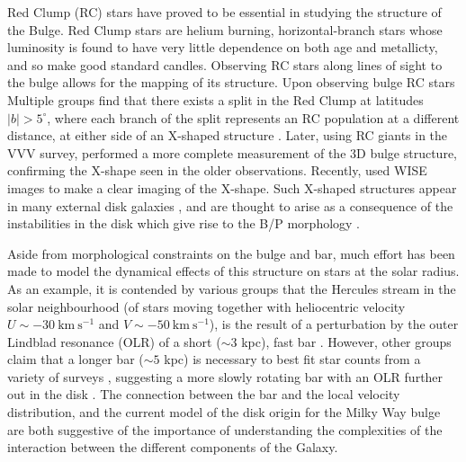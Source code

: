 Red Clump (RC) stars have proved to be essential in studying the structure of the Bulge. Red Clump stars are helium burning, horizontal-branch stars whose luminosity is found to have very little dependence on both age and metallicty, and so make good standard candles. Observing RC stars along lines of sight to the bulge allows for the mapping of its structure. Upon observing bulge RC stars Multiple groups find that there exists a split in the Red Clump at latitudes $|b| > 5^{\circ}$, where each branch of the split represents an RC population at a different distance, at either side of an X-shaped structure \citep{2010ApJ...721L..28N,2010ApJ...724.1491M,2011AJ....142...76S}. Later, using RC giants in the VVV survey, \citet{2013MNRAS.435.1874W} performed a more complete measurement of the 3D bulge structure, confirming the X-shape seen in the older observations. Recently, \citet{2016AJ....152...14N} used WISE images to make a clear imaging of the X-shape. Such X-shaped structures appear in many external disk galaxies \citep[e.g.][]{2006MNRAS.370..753B}, and are thought to arise as a consequence of the instabilities in the disk which give rise to the B/P morphology \citep[based on studies of N-body simulations, e.g.][]{2005MNRAS.358.1477A,2006ApJ...645..209D}.

Aside from morphological constraints on the bulge and bar, much effort has been made to model the dynamical effects of this structure on stars at the solar radius. As an example, it is contended by various groups that the Hercules stream in the solar neighbourhood (of stars moving together with heliocentric velocity $U \sim -30\ \mathrm{km\ s^{-1}}$ and $V \sim -50\ \mathrm{km\ s^{-1}}$), is the result of a perturbation by the outer Lindblad resonance (OLR) of a short ($\sim 3$ kpc), fast bar \citep{2000AJ....119..800D,2014A&A...563A..60A,2017MNRAS.466L.113M}. However, other groups claim that a longer bar ($\sim 5$ kpc) is necessary to best fit star counts from a variety of surveys \citep{2015MNRAS.450.4050W}, suggesting a more slowly rotating bar with an OLR further out in the disk \citep[although see][for a reconciliation of Hercules with a long, slow bar]{2018MNRAS.477.3945H}. The connection between the bar and the local velocity distribution, and the current model of the disk origin for the Milky Way bulge are both suggestive of the importance of understanding the complexities of the interaction between the different components of the Galaxy.

